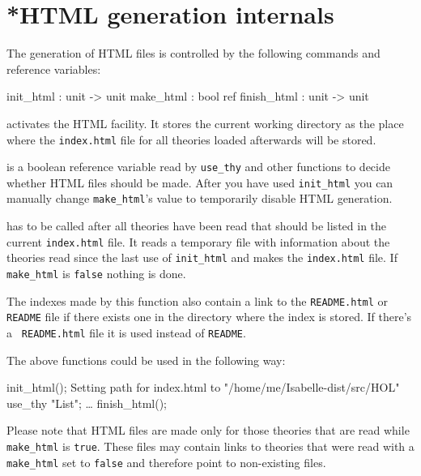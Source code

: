 \section*{*HTML generation internals}

The generation of HTML files is controlled by the following {\ML}
commands and reference variables:
\begin{ttbox}
init_html   : unit -> unit
make_html   : bool ref
finish_html : unit -> unit
\end{ttbox}

\begin{ttdescription}
\item[\ttindexbold{init_html}]
activates the HTML facility. It stores the current working directory
as the place where the {\tt index.html} file for all theories loaded
afterwards will be stored.

\item[\ttindexbold{make_html}]
is a boolean reference variable read by {\tt use_thy} and other
functions to decide whether HTML files should be made. After you have
used {\tt init_html} you can manually change {\tt make_html}'s value
to temporarily disable HTML generation.

\item[\ttindexbold{finish_html}]
has to be called after all theories have been read that should be
listed in the current {\tt index.html} file. It reads a temporary
file with information about the theories read since the last use of
{\tt init_html} and makes the {\tt index.html} file. If {\tt
make_html} is {\tt false} nothing is done.

The indexes made by this function also contain a link to the
\texttt{README.html} or \texttt{README} file if there exists one in
the directory where the index is stored. If there's a {\tt
  README.html} file it is used instead of {\tt README}.

\end{ttdescription}

The above functions could be used in the following way:

\begin{ttbox}
init_html();
{\out Setting path for index.html to "/home/me/Isabelle-dist/src/HOL"}
use_thy "List";
\dots
finish_html();
\end{ttbox}

Please note that HTML files are made only for those theories that are
read while \texttt{make_html} is \texttt{true}. These files may
contain links to theories that were read with a \texttt{make_html} set
to \texttt{false} and therefore point to non-existing files.


